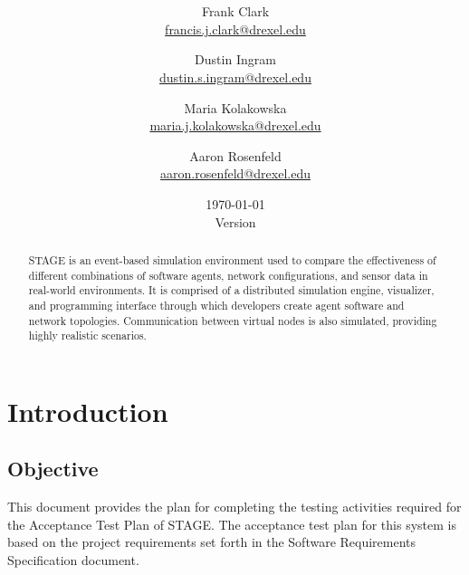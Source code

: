 \documentclass[titlepage]{article}
\title{\textbf{\mytitle}}
\author{
    Frank Clark \\\url{francis.j.clark@drexel.edu}
    \and Dustin Ingram \\\url{dustin.s.ingram@drexel.edu}
    \and Maria Kolakowska \\\url{maria.j.kolakowska@drexel.edu}
    \and Aaron Rosenfeld \\\url{aaron.rosenfeld@drexel.edu}
}
\date{\today\\Version \version}
\begin{document}

\begin{figure}
    \vspace{-2em}
    \centering
    
    \vspace{-4em}
\end{figure}

\maketitle

\begin{abstract}
STAGE is an event-based simulation environment used to compare the effectiveness of different combinations of software agents, network configurations, and sensor data in real-world environments.  It is comprised of a distributed simulation engine, visualizer, and programming interface through which developers create agent software and network topologies.  Communication between virtual nodes is also simulated, providing highly realistic scenarios.
\end{abstract}

\setcounter{tocdepth}{4}
\tableofcontents
\pagebreak
{}



\section{Introduction%
  \label{introduction}%
}


\subsection{Objective%
  \label{objective}%
}
    This document provides the plan for completing the testing activities required for the Acceptance Test Plan of STAGE. The acceptance test plan for this system is based on the project requirements set forth in the Software Requirements Specification document.

\end{document}
